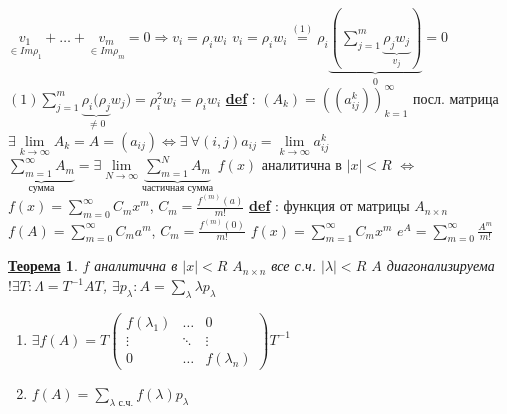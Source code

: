 \documentclass[12pt,a4paper]{article}
\newcommand{\bfline}[1]{\textbf{\underline{#1}}}
\newcommand{\Def}{\bfline{def} }
\newtheorem*{theorem*}{\bfline{Теорема}}
\begin{document}
$\underset{\in Im \rho_1}{v_1} + \ldots + \underset{\in Im \rho_m}{v_m} = 0 \Rightarrow v_i = \rho_i w_i$ \newline
$v_i = \rho_i w_i \overset{(1)}{=} \rho_i \underset{0}{\underbrace{\left( \sum\limits_{j=1}^{m} \underset{v_j}{\underbrace{\rho_j w_j}} \right)}}=0$ \newline
$(1) \sum\limits_{j=1}^{m} \underset{\neq 0}{\underbrace{\rho_i (\rho_j}} w_j) = \rho_i^2 w_i = \rho_i w_i$ \newline
\Def : $(A_k) = \left((a_{ij}^k) \right)_{k=1}^{\infty}$ посл. матрица \newline
$\exists \lim\limits_{k\rightarrow \infty} A_k = A=(a_{ij}) \Leftrightarrow \exists\ \forall(i, j) a_{ij} = \lim\limits_{k\rightarrow \infty} a_{ij}^{k}$ \newline
$\underset{\text{сумма}}{\underbrace{\sum\limits_{m=1}^{\infty} A_m}} = \exists \lim\limits_{N\rightarrow \infty} \underset{\text{частичная сумма}}{\underbrace{\sum\limits_{m=1}^{N} A_m}}$ \newline
$f(x)$ аналитична в $|x| < R$ $\Leftrightarrow$ $f(x) = \sum\limits_{m=0}^{\infty} C_m x^m$, $C_m = \frac{f^{(m)} (a)}{m!}$ \newline
\Def : функция от матрицы $A_{n \times n}$ \newline
$f(A) = \sum\limits_{m=0}^{\infty} C_m a^m$, $C_m = \frac{f^{(m)}(0)}{m!}$ \newline
$f(x) = \sum\limits_{m=1}^{\infty} C_m x^m$ \newline
$e^A = \sum\limits_{m=0}^{\infty} \frac{A^m}{m!}$
\begin{theorem*}
$f$ аналитична в $|x| < R$ \newline
$A_{n \times n}$ все с.ч. $|\lambda| < R$ \newline
$A$ диагонализируема $! \exists T: \Lambda = T^{-1} A T$, $\exists p_{\lambda}: A = \sum\limits_{\lambda} \lambda p_{\lambda}$
\begin{enumerate}
	\item $\exists f(A) = T
		\left(
		\begin{matrix}
			f(\lambda_1) & \ldots & 0 \\
			\vdots & \ddots & \vdots \\
			0 & \ldots & f(\lambda_n)
		\end{matrix}
		\right) T^{-1}$
	\item $f(A) = \sum\limits_{\lambda \text{ с.ч.}} f(\lambda) p_{\lambda}$
\end{enumerate}
\end{theorem*}
\end{document}

